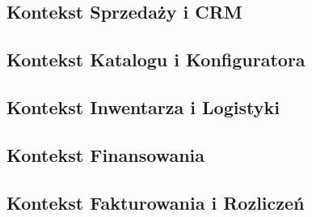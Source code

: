 \subsection{Kontekst Sprzedaży i CRM}


\newpage
\subsection{Kontekst Katalogu i Konfiguratora}


\newpage
\subsection{Kontekst Inwentarza i Logistyki}


\newpage
\subsection{Kontekst Finansowania}


\newpage
\subsection{Kontekst Fakturowania i Rozliczeń}

